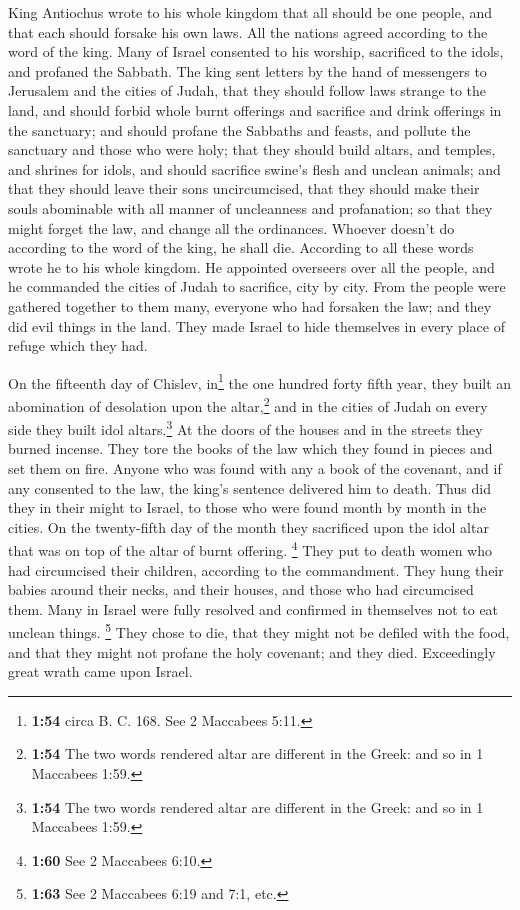  King Antiochus wrote to his whole kingdom that all
should be one people,  and that each should forsake his
own laws. All the nations agreed according to the word of the king.
 Many of Israel consented to his worship, sacrificed to
the idols, and profaned the Sabbath.  The king sent
letters by the hand of messengers to Jerusalem and the cities of Judah,
that they should follow laws strange to the land,  and
should forbid whole burnt offerings and sacrifice and drink offerings in
the sanctuary; and should profane the Sabbaths and feasts,
 and pollute the sanctuary and those who were holy;
 that they should build altars, and temples, and shrines
for idols, and should sacrifice swine's flesh and unclean animals;
 and that they should leave their sons uncircumcised,
that they should make their souls abominable with all manner of
uncleanness and profanation;  so that they might forget
the law, and change all the ordinances.  Whoever doesn't
do according to the word of the king, he shall die. 
According to all these words wrote he to his whole kingdom. He appointed
overseers over all the people, and he commanded the cities of Judah to
sacrifice, city by city.  From the people were gathered
together to them many, everyone who had forsaken the law; and they did
evil things in the land.  They made Israel to hide
themselves in every place of refuge which they had.

 On the fifteenth day of Chislev, in\footnote{\textbf{1:54}
  circa B. C. 168. See 2 Maccabees 5:11.} the one hundred forty fifth
year, they built an abomination of desolation upon the altar,\footnote{\textbf{1:54}
  The two words rendered altar are different in the Greek: and so in 1
  Maccabees 1:59.} and in the cities of Judah on every side they built
idol altars.\footnote{\textbf{1:54} The two words rendered altar are
  different in the Greek: and so in 1 Maccabees 1:59.} 
At the doors of the houses and in the streets they burned incense.
 They tore the books of the law which they found in
pieces and set them on fire.  Anyone who was found with
any a book of the covenant, and if any consented to the law, the king's
sentence delivered him to death.  Thus did they in their
might to Israel, to those who were found month by month in the cities.
 On the twenty-fifth day of the month they sacrificed
upon the idol altar that was on top of the altar of burnt offering.
 \footnote{\textbf{1:60} See 2 Maccabees 6:10.} They put
to death women who had circumcised their children, according to the
commandment.  They hung their babies around their necks,
and their houses, and those who had circumcised them. 
Many in Israel were fully resolved and confirmed in themselves not to
eat unclean things.  \footnote{\textbf{1:63} See 2
  Maccabees 6:19 and 7:1, etc.} They chose to die, that they might not
be defiled with the food, and that they might not profane the holy
covenant; and they died.  Exceedingly great wrath came
upon Israel.

